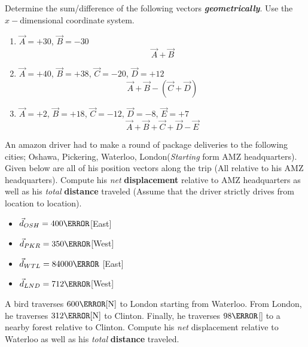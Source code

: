 \documentclass[12pt]{article} %
\newcommand{\tx}[1]{\text{#1}}
\begin{document}
\begin{qstn}[3]
    Determine the sum/difference of the following vectors \textbf{\emph{geometrically}}. Use the $x-$dimensional coordinate system.
\begin{enumerate}[label=(\alph*)]
    \item $\vec A = +30$, $\vec B = -30$ $$\vec A + \vec B$$
    \vspace*{7cm}
    \item $\vec A = +40$, $\vec B = +38$, $\vec C = -20$, $\vec D = +12$   $$\vec A + \vec B - (\vec C + \vec D)$$
    \newpage
    \item $\vec A = +2$, $\vec B = +18$, $\vec C = -12$, $\vec D = -8$, $\vec E = +7$  $$\vec A  + \vec B + \vec C + \vec D - \vec E$$
    \vspace*{7cm}
\end{enumerate}


\end{qstn}


\begin{qstn}[4]
An amazon driver had to make a round of package deliveries to the following cities; Oshawa, Pickering, Waterloo, London(\emph{Starting} form AMZ headquarters). Given below are all of his position vectors along the trip (All relative to his AMZ headquarters). Compute his \emph{net} \textbf{displacement} relative to AMZ headquarters as well as his \emph{total} \textbf{distance} traveled (Assume that the driver strictly drives from location to location).
\begin{itemize}
\item $\vec d_{OSH} = 400 \km$[East]
\item $\vec d_{PKR} = 350\km$[West]
\item $\vec d_{WTL} = 84000\m$ [East]
\item $\vec d_{LND} = 712\km$[West]
\end{itemize}

\end{qstn}

\begin{qstn}[5]
    A bird traverses $600\km[\tx{N}]$ to London starting from Waterloo. From London, he traverses $312\km[\tx{N}]$ to Clinton. Finally, he traverses $98\km$[\tx{S}] to a nearby forest relative to Clinton. Compute his \emph{net} displacement relative to Waterloo as well as his \emph{total} \textbf{distance} traveled. 
    
\end{qstn}
\end{document}
